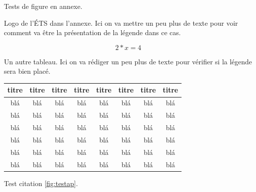 \documentclass[letterpaper, twoside, 12pt, memoire, creativecommons, hyperref]{thETS}
\begin{document}
Tests de figure en annexe.

%

\begin{figureap}[ht]
	\caption{Logo de l'ÉTS dans l'annexe. Ici on va mettre un peu plus de texte pour voir comment va être la présentation de
	la légende dans ce cas.}
	\label{fig:testap}
\end{figureap}
\begin{center}
\begin{equation} 
2*x=4 
\end{equation}
\end{center}

\begin{tableap}[*ht]
	\caption{Un autre tableau. Ici on va rédiger un peu plus de texte pour vérifier si la légende sera bien placé.}
		\begin{tabular}{|c|c|c|c|c|c|c|c|}
		\hline
			{\bf titre} & {\bf titre} & {\bf titre} & {\bf titre} & {\bf titre} & {\bf titre} & {\bf titre} & {\bf titre} \\
	  \hline
			blá & blá & blá & blá & blá & blá & blá & blá \\
	  \hline
			blá & blá & blá & blá & blá & blá & blá & blá \\
	  \hline
			blá & blá & blá & blá & blá & blá & blá & blá \\
	  \hline
			blá & blá & blá & blá & blá & blá & blá & blá \\
	  \hline
			blá & blá & blá & blá & blá & blá & blá & blá \\
	  \hline
			blá & blá & blá & blá & blá & blá & blá & blá \\
	  \hline
		\end{tabular}
	\label{tab:tableau_annexe}
\end{tableap}

Test citation \ref{fig:testap}.
\end{document}
